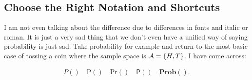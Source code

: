 \documentclass[aos,preprint]{imsart}
\begin{document}
\subsection{Choose the Right Notation and Shortcuts}

I am not even talking about the difference due to differences in fonts and italic or roman.
It is just a very sad thing that we don't even have a unified way of saying probability is just sad.
Take probability for example and return to the most basic case of tossing a
coin
where the sample space is $\mathcal{A} = \{H, T\}$. I have come across:

\begin{align*}
	P() \quad \mathrm{P}() \quad \mathrm{Pr}() \quad \mathsf{P}() \quad
	\mathbf{Prob}().
\end{align*}
\end{document}
